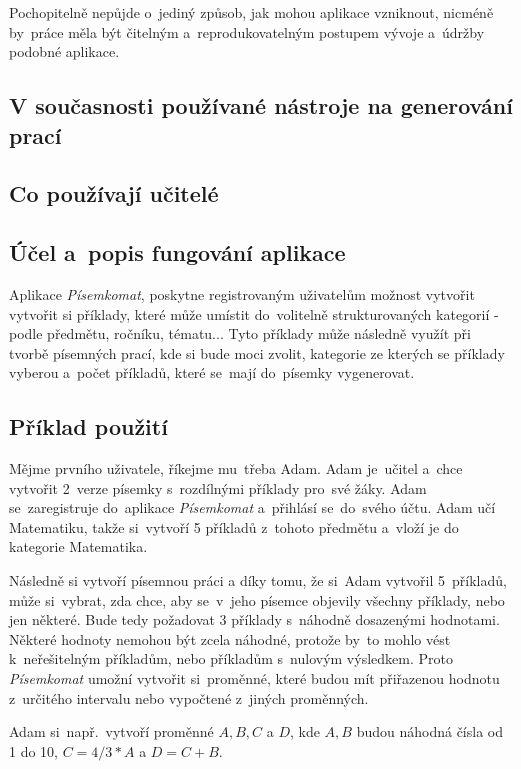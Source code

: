 \documentclass[14pt,a4paper]{article}
\begin{document}
    Pochopitelně nepůjde o~jediný způsob, jak mohou aplikace vzniknout, nicméně by~práce měla být čitelným a~reprodukovatelným postupem vývoje
    a~údržby podobné aplikace.
        
        \subsection{V současnosti používané nástroje na generování prací}
        \subsection{Co používají učitelé}

        \subsection{Účel a~popis fungování aplikace}
        Aplikace \emph{Písemkomat}, poskytne registrovaným uživatelům možnost vytvořit vytvořit si příklady, které může umístit do~volitelně
        strukturovaných kategorií - podle předmětu, ročníku, tématu... Tyto příklady může následně využít při tvorbě písemných prací,
        kde si bude moci zvolit, kategorie ze kterých se příklady vyberou a~počet příkladů, které se~mají do~písemky vygenerovat. 
        \subsection{Příklad použití}
        Mějme prvního uživatele, říkejme mu~třeba Adam. Adam je~učitel a~chce vytvořit 2~verze písemky s~rozdílnými příklady pro~své žáky.
        Adam se~zaregistruje do~aplikace \emph{Písemkomat} a~přihlásí se~do~svého účtu. Adam učí Matematiku, takže si~vytvoří 5 příkladů z~tohoto předmětu
        a~vloží je do kategorie Matematika.

        Následně si vytvoří písemnou práci a díky tomu, že si~Adam vytvořil 5~příkladů, může si~vybrat, zda chce,
        aby se~v~jeho písemce objevily všechny příklady, nebo jen některé. Bude tedy požadovat 3 příklady s~náhodně dosazenými hodnotami.
        Některé hodnoty nemohou být zcela náhodné, protože by~to mohlo vést k~neřešitelným příkladům, nebo příkladům s~nulovým výsledkem.
        Proto \emph{Písemkomat} umožní vytvořit si~proměnné, které budou mít přiřazenou hodnotu z~určitého intervalu nebo vypočtené z~jiných proměnných.

        Adam si~např.~vytvoří proměnné $A, B, C$ a $D$, kde $A, B$ budou náhodná čísla od 1 do 10, $C = 4/3*A$ a $D = C + B$.
\end{document}
